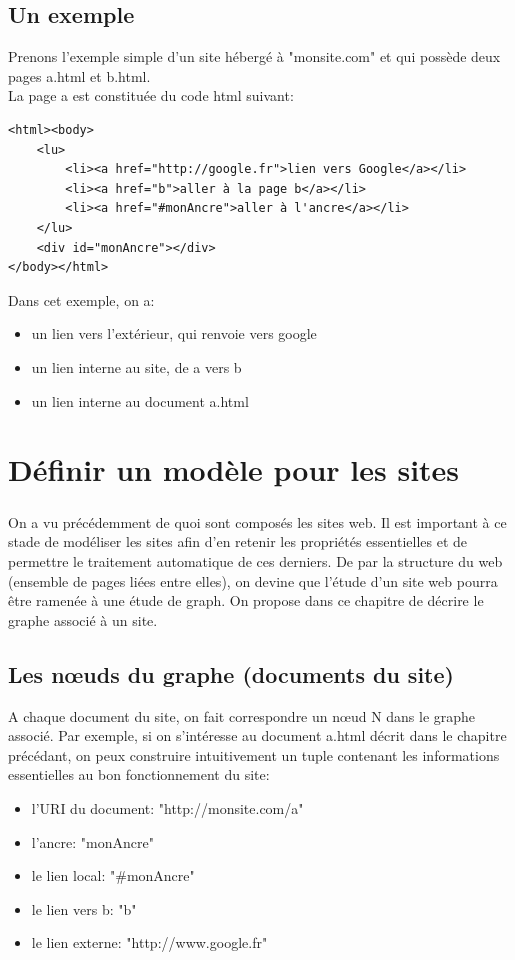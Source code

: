\documentclass[a4paper]{report}
\begin{document}
\section{Un exemple\\}
Prenons l'exemple simple d'un site hébergé à "monsite.com" et qui possède deux pages a.html et b.html.\\
La page a est constituée du code html suivant:\\
\begin{verbatim}
<html><body>
	<lu>
		<li><a href="http://google.fr">lien vers Google</a></li>
		<li><a href="b">aller à la page b</a></li>
		<li><a href="#monAncre">aller à l'ancre</a></li>
	</lu>
	<div id="monAncre"></div>
</body></html>
\end{verbatim}
Dans cet exemple, on a:
\begin{itemize}
\item un lien vers l’extérieur, qui renvoie vers google
\item un lien interne au site, de a vers b
\item un lien interne au document a.html
\end{itemize}

\chapter*{Définir un modèle pour les sites}

\paragraph*{}
On a vu précédemment de quoi sont composés les sites web. Il est important à ce stade de modéliser les sites afin d'en retenir les propriétés essentielles et de permettre le traitement automatique de ces derniers. De par la structure du web (ensemble de pages liées entre elles), on devine que l'étude d'un site web pourra être ramenée à une étude de graph. On propose dans ce chapitre de décrire le graphe associé à un site.

\section{ Les nœuds du graphe (documents du site)\\ }
A chaque document du site, on fait correspondre un nœud N dans le graphe associé.
Par exemple, si on s'intéresse au document a.html décrit dans le chapitre précédant, on peux construire intuitivement un tuple contenant les informations essentielles au bon fonctionnement du site:
\begin{itemize}
\item l'URI du document: "http://monsite.com/a"
\item l'ancre: "monAncre"
\item le lien local: "$\#$monAncre"
\item le lien vers b: "b"
\item le lien externe: "http://www.google.fr"\\
\end{itemize}
\end{document}
